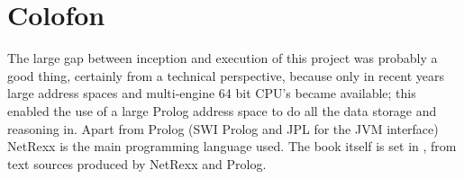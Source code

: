 \chapter{Colofon}The large gap between inception and execution of this
project was probably a good thing, certainly from a technical
perspective, because only in recent years large address spaces and
multi-engine 64 bit CPU's became available; this enabled the use of a
large Prolog address space to do all the data storage and reasoning
in. Apart from Prolog (SWI Prolog and JPL for the JVM interface)
NetRexx is the main programming language used. The book itself is set
in \XeLaTex, from text sources produced by NetRexx and Prolog.
